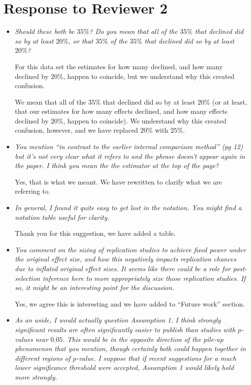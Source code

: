 \documentclass[]{article}
\theoremstyle{remark}
\begin{document}
\section{Response to Reviewer 2}

\begin{itemize}

\item {\em Should these both be $35\%$? Do you mean that all of the $35\%$ that declined did so by at least $20\%$, or that $35\%$ of the $35\%$ that declined did so by at least $20\%$?}

For this data set the estimates for how many declined, and how many declined by $20\%$, happen to coincide, but we understand why this created confusion. 

We mean that all of the $35\%$ that declined did so by at least $20\%$ (or at least, that our estimates for how many effects declined, and how many effects declined by $20\%$, happen to coincide). We understand why this created confusion, however, and we have replaced $20\%$ with $25\%$.

\item {\em You mention ``in contrast to the earlier internal comparison method'' (pg 12) but it’s not very clear what it refers to and the phrase doesn’t appear again in the paper. I think you mean the the estimator at the top of the page?}

Yes, that is what we meant. We have rewritten to clarify what we are referring to.

\item {\em In general, I found it quite easy to get lost in the notation. You might find a notation table useful for clarity.}

Thank you for this suggestion, we have added a table.

\item {\em You comment on the sizing of replication studies to achieve fixed power under the original effect size, and how this negatively impacts replication chances due to inflated original effect sizes. It seems like there could be a role for post-selection inference here to more appropriately size those replication studies. If so, it might be an interesting point for the discussion.}

Yes, we agree this is interesting and we have added to ``Future work'' section.

\item {\em As an aside, I would actually question Assumption 1. I think strongly significant results are often significantly easier to publish than studies with $p$-values near $0.05$. This would be in the opposite direction of the pile-up phenomenon that you mention, though certainly both could happen together in different regions of $p$-value. I suppose that if recent suggestions for a much lower significance threshold were accepted, Assumption 1 would likely hold more strongly.}


\end{itemize}
\end{document}
